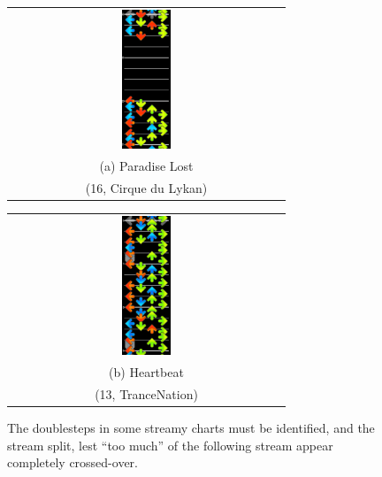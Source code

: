 \documentclass[10pt]{sigplanconf}
\begin{document}
\begin{figure}[t]
	\begin{center}
	\begin{tabular}{c}
		\includegraphics[width=0.18\textwidth]{paradise-lost-false-positive.png}
		\\
		(a) Paradise Lost \\
		(16, Cirque du Lykan)
	\end{tabular}
	\begin{tabular}{c}
		\includegraphics[width=0.18\textwidth]{hearbeat-rollstream-doublestep.png}
		\\
		(b) Heartbeat \\
		(13, TranceNation)
	\end{tabular}
	\end{center}
	\caption{The doublesteps in some streamy charts must be identified, and the stream split, lest ``too much'' of the following stream appear completely crossed-over.}
	\label{fig:force-doublestep}
\end{figure}
\end{document}
